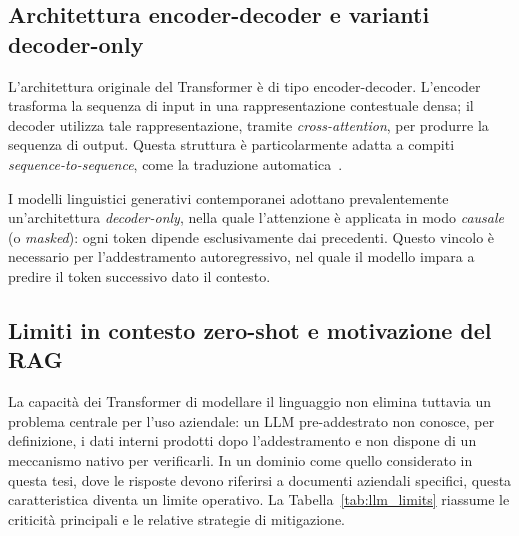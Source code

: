 \subsection{Architettura encoder-decoder e varianti decoder-only}

L'architettura originale del Transformer è di tipo encoder-decoder. L'encoder
trasforma la sequenza di input in una rappresentazione contestuale densa; il
decoder utilizza tale rappresentazione, tramite \textit{cross-attention}, per
produrre la sequenza di output. Questa struttura è particolarmente adatta a
compiti \textit{sequence-to-sequence}, come la traduzione
automatica~\cite{vaswani2017attention}.

I modelli linguistici generativi contemporanei adottano prevalentemente un'architettura 
\textit{decoder-only}, nella quale l'attenzione è applicata in modo
\textit{causale} (o \textit{masked}): ogni token dipende esclusivamente dai
precedenti. Questo vincolo è necessario per l'addestramento autoregressivo,
nel quale il modello impara a predire il token successivo dato il contesto.

\subsection{Limiti in contesto zero-shot e motivazione del RAG}
\label{subsec:llm_limits}

La capacità dei Transformer di modellare il linguaggio non elimina tuttavia un
problema centrale per l'uso aziendale: un LLM pre-addestrato non conosce, per
definizione, i dati interni prodotti dopo l'addestramento e non dispone di un
meccanismo nativo per verificarli. In un dominio come quello considerato in
questa tesi, dove le risposte devono riferirsi a documenti aziendali specifici,
questa caratteristica diventa un limite operativo. La
Tabella~\ref{tab:llm_limits} riassume le criticità principali e le relative
strategie di mitigazione.

